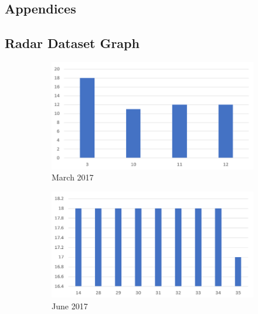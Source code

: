 \documentclass{l4proj}
\begin{document}
\begin{appendices}

\chapter{Appendices}

\section{Radar Dataset Graph}
\begin{figure}[h]
   \centering
   \begin{subfigure}[b]{0.43\textwidth}
        \includegraphics[width=\textwidth]{images/dataset-march2017.png}
        \caption{March 2017}
        \label{fig:dataset-march2017}
    \end{subfigure}
    \hfill
    \begin{subfigure}[b]{0.43\textwidth}
        \includegraphics[width=\textwidth]{images/dataset-june2017.png}
        \caption{June 2017}
        \label{fig:dataset-june2017}
    \end{subfigure}
    \hfill
    \begin{subfigure}[b]{0.43\textwidth}

\end{subfigure}
\end{figure}
\end{appendices}
\end{document}

